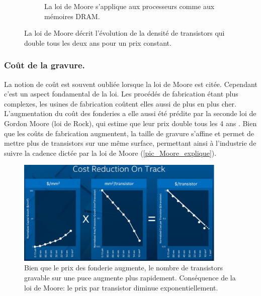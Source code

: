\begin{figure}
\begin{subfigure}[]{0.48\linewidth}
        \caption{La loi de Moore s'applique aux processeurs comme aux mémoires DRAM.}
        \label{processeurs_porte_moore_dram}
    \end{subfigure}
    \caption{La loi de Moore décrit l'évolution de la densité de transistors qui double tous les deux ans pour un prix constant.}
    \label{fig_processeurs_moore}
\end{figure}





\subsubsection{Coût de la gravure.}

La notion de coût est souvent oubliée lorsque la loi de Moore est citée. Cependant c'est un aspect fondamental de la loi. Les procédés de fabrication étant plus complexes, les usines de fabrication coûtent elles aussi de plus en plus cher. L'augmentation du coût des fonderies a elle aussi été prédite par la seconde loi de Gordon Moore (loi de Rock), qui estime que leur prix double tous les 4 ans \cite{schaller1997moore}. Bien que les coûts de fabrication augmentent, la taille de gravure s’affine et permet de mettre plus de transistors sur une même surface, permettant ainsi à l’industrie de suivre la cadence dictée par la loi de Moore (\autoref{pic_Moore_explique}).

\begin{figure}
    \center
    \includegraphics[width=10cm]{images/processeurs_porte_moore.png}
    \caption{\label{pic_Moore_explique} Bien que le prix des fonderie augmente, le nombre de transistors gravable sur une puce augmente plus rapidement. Conséquence de la loi de Moore: le prix par transistor diminue exponentiellement.}
\end{figure}



